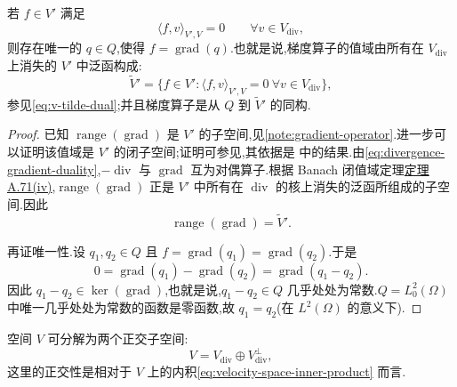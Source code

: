 \begin{lemma}[梯度算子的同构性质]\label{lem:gradient-isomorphism}
若 $f\in V'$ 满足
\[
  \langle f,v\rangle_{V',V}=0\qquad\forall v\in V_{\mathrm{div}},
\]
则存在唯一的 $q\in Q$,使得 $f=\operatorname{grad}(q)$.也就是说,梯度算子的值域由所有在 $V_{\mathrm{div}}$ 上消失的 $V'$ 中泛函构成:
\[
  \widetilde V'
    =\{f\in V':\langle f,v\rangle_{V',V}=0
                     \ \forall v\in V_{\mathrm{div}}\},
\]
参见\cref{eq:v-tilde-dual};并且梯度算子是从 $Q$ 到 $\widetilde V'$ 的同构.
\end{lemma}
\begin{proof}
已知 $\operatorname{range}(\operatorname{grad})$ 是 $V'$ 的子空间,见\cref{note:gradient-operator}.进一步可以证明该值域是 $V'$ 的闭子空间;证明可参见\textcite[第 20 页]{GiraultRaviart1986},其依据是\textcite{Carroll1966,DuvautLions1972} 中的结果.由\cref{eq:divergence-gradient-duality},$-\operatorname{div}$ 与 $\operatorname{grad}$ 互为对偶算子.根据 Banach 闭值域定理\hyperref[thm:appendix-a-71]{定理 A.71(iv)},$\operatorname{range}(\operatorname{grad})$ 正是 $V'$ 中所有在 $\operatorname{div}$ 的核上消失的泛函所组成的子空间.因此
\[
  \operatorname{range}(\operatorname{grad})=\widetilde V'.
\]

再证唯一性.设 $q_1,q_2\in Q$ 且 $f=\operatorname{grad}(q_1)=\operatorname{grad}(q_2)$.于是
\[
  0=\operatorname{grad}(q_1)-\operatorname{grad}(q_2)
    =\operatorname{grad}(q_1-q_2).
\]
因此 $q_1-q_2\in\ker(\operatorname{grad})$,也就是说,$q_1-q_2\in Q$ 几乎处处为常数.$Q=L_0^2(\Omega)$ 中唯一几乎处处为常数的函数是零函数,故 $q_1=q_2$(在 $L^2(\Omega)$ 的意义下).
\end{proof}

\begin{note}[$V$ 的正交分解]\label{note:v-orthogonal-decomposition}
空间 $V$ 可分解为两个正交子空间:
\[
  V=V_{\mathrm{div}}\oplus V_{\mathrm{div}}^{\perp},
\]
这里的正交性是相对于 $V$ 上的内积\cref{eq:velocity-space-inner-product} 而言.
\end{note}


